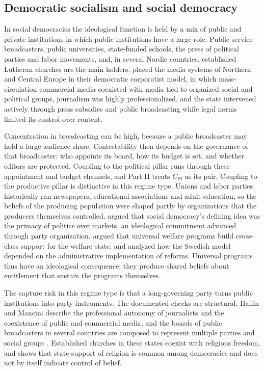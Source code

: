 \documentclass[11pt,letterpaper]{article}
\theoremstyle{definition}
\theoremstyle{remark}
\newcommand{\pP}{\mathsf{P}}
\newcommand{\pI}{\mathsf{I}}
\begin{document}
\subsection{Democratic socialism and social democracy}

In social democracies the ideological function is held by a mix of public and private institutions in which public institutions have a large role. Public service broadcasters, public universities, state-funded schools, the press of political parties and labor movements, and, in several Nordic countries, established Lutheran churches are the main holders. \citet{hallin2004} placed the media systems of Northern and Central Europe in their democratic corporatist model, in which mass-circulation commercial media coexisted with media tied to organized social and political groups, journalism was highly professionalized, and the state intervened actively through press subsidies and public broadcasting while legal norms limited its control over content.

Concentration in broadcasting can be high, because a public broadcaster may hold a large audience share. Contestability then depends on the governance of that broadcaster: who appoints its board, how its budget is set, and whether editors are protected. Coupling to the political pillar runs through these appointment and budget channels, and Part II treats $C_{\pP\pI}$ as its pair. Coupling to the productive pillar is distinctive in this regime type. Unions and labor parties historically ran newspapers, educational associations and adult education, so the beliefs of the producing population were shaped partly by organizations that the producers themselves controlled. \citet{berman2006} argued that social democracy's defining idea was the primacy of politics over markets, an ideological commitment advanced through party organization. \citet{esping1990} argued that universal welfare programs build cross-class support for the welfare state, and \citet{rothstein1996} analyzed how the Swedish model depended on the administrative implementation of reforms. Universal programs thus have an ideological consequence: they produce shared beliefs about entitlement that sustain the programs themselves.

The capture risk in this regime type is that a long-governing party turns public institutions into party instruments. The documented checks are structural. Hallin and Mancini describe the professional autonomy of journalists and the coexistence of public and commercial media, and the boards of public broadcasters in several countries are composed to represent multiple parties and social groups \citep{hallin2004}. Established churches in these states coexist with religious freedom, and \citet{fox2008} shows that state support of religion is common among democracies and does not by itself indicate control of belief.
\end{document}
